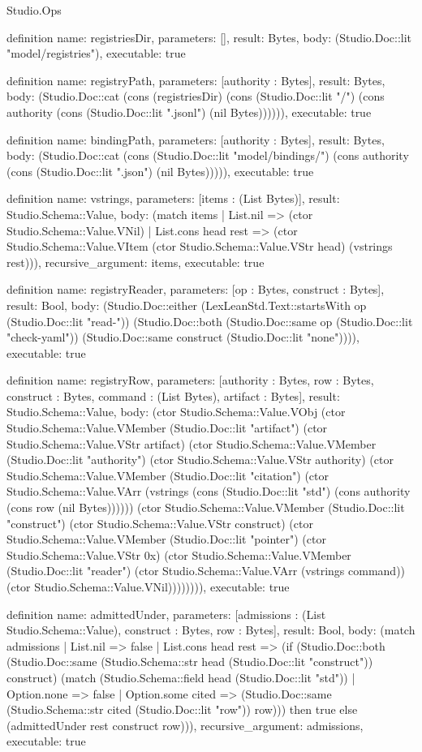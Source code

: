 \begin{lexlean}{Studio.Ops}
\begin{semanticmodule}
{definition{
  name: registriesDir,
  parameters: [],
  result: Bytes,
  body: (Studio.Doc::lit "model/registries"),
  executable: true
}

definition{
  name: registryPath,
  parameters: [authority : Bytes],
  result: Bytes,
  body: (Studio.Doc::cat (cons (registriesDir) (cons (Studio.Doc::lit "/") (cons authority (cons (Studio.Doc::lit ".jsonl") (nil Bytes)))))),
  executable: true
}

definition{
  name: bindingPath,
  parameters: [authority : Bytes],
  result: Bytes,
  body: (Studio.Doc::cat (cons (Studio.Doc::lit "model/bindings/") (cons authority (cons (Studio.Doc::lit ".json") (nil Bytes))))),
  executable: true
}

definition{
  name: vstrings,
  parameters: [items : (List Bytes)],
  result: Studio.Schema::Value,
  body: (match items
    | List.nil => (ctor Studio.Schema::Value.VNil)
    | List.cons head rest => (ctor Studio.Schema::Value.VItem (ctor Studio.Schema::Value.VStr head) (vstrings rest))),
  recursive_argument: items,
  executable: true
}

definition{
  name: registryReader,
  parameters: [op : Bytes, construct : Bytes],
  result: Bool,
  body: (Studio.Doc::either (LexLeanStd.Text::startsWith op (Studio.Doc::lit "read-")) (Studio.Doc::both (Studio.Doc::same op (Studio.Doc::lit "check-yaml")) (Studio.Doc::same construct (Studio.Doc::lit "none")))),
  executable: true
}

definition{
  name: registryRow,
  parameters: [authority : Bytes, row : Bytes, construct : Bytes, command : (List Bytes), artifact : Bytes],
  result: Studio.Schema::Value,
  body: (ctor Studio.Schema::Value.VObj (ctor Studio.Schema::Value.VMember (Studio.Doc::lit "artifact") (ctor Studio.Schema::Value.VStr artifact) (ctor Studio.Schema::Value.VMember (Studio.Doc::lit "authority") (ctor Studio.Schema::Value.VStr authority) (ctor Studio.Schema::Value.VMember (Studio.Doc::lit "citation") (ctor Studio.Schema::Value.VArr (vstrings (cons (Studio.Doc::lit "std") (cons authority (cons row (nil Bytes)))))) (ctor Studio.Schema::Value.VMember (Studio.Doc::lit "construct") (ctor Studio.Schema::Value.VStr construct) (ctor Studio.Schema::Value.VMember (Studio.Doc::lit "pointer") (ctor Studio.Schema::Value.VStr 0x) (ctor Studio.Schema::Value.VMember (Studio.Doc::lit "reader") (ctor Studio.Schema::Value.VArr (vstrings command)) (ctor Studio.Schema::Value.VNil)))))))),
  executable: true
}

definition{
  name: admittedUnder,
  parameters: [admissions : (List Studio.Schema::Value), construct : Bytes, row : Bytes],
  result: Bool,
  body: (match admissions
    | List.nil => false
    | List.cons head rest => (if (Studio.Doc::both (Studio.Doc::same (Studio.Schema::str head (Studio.Doc::lit "construct")) construct) (match (Studio.Schema::field head (Studio.Doc::lit "std"))
      | Option.none => false
      | Option.some cited => (Studio.Doc::same (Studio.Schema::str cited (Studio.Doc::lit "row")) row))) then true else (admittedUnder rest construct row))),
  recursive_argument: admissions,
  executable: true
}

}
\end{semanticmodule}
\end{lexlean}
